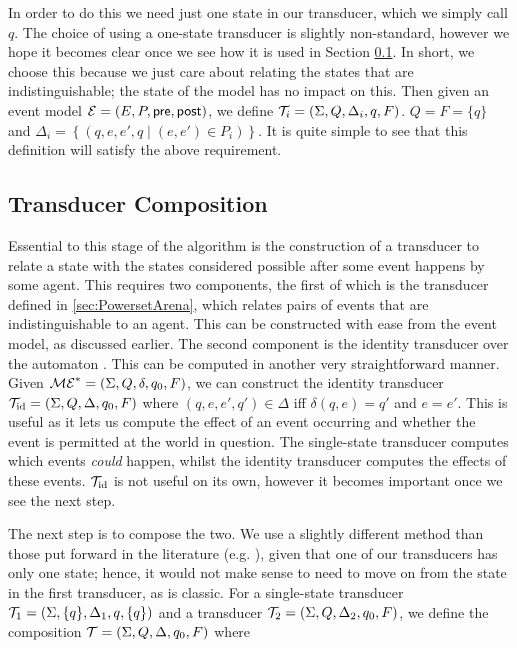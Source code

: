 \documentclass[ %
                    author={Leo Poulson},
                supervisor={Dr. Steven Ramsay},
                    degree={BSc},
                     title={Epistemic Planning for the Dynamic Gossip problem},
                  subtitle={},
                      year={2019} ]{dissertation}
\begin{document}
In order to do this we need just one state in our transducer, which we simply
call $q$. The choice of using a one-state transducer is slightly non-standard,
however we hope it becomes clear once we see how it is used in Section
\ref{sec:TransducerComposition}. In short, we choose this because we just care
about relating the states that are indistinguishable; the state of the model has
no impact on this. Then given an event model $\mathcal{E} = (E, P, \textsf{pre}, \textsf{post})$, we
define $\mathcal{T}_i = (\Sigma, Q, \Delta_i, q, F)$. $Q = F = \{q\}$ and $\Delta_i =
\left\{ (q, e, e', q \mid (e, e') \in P_i) \right\}$. It is quite simple to see
that this definition will satisfy the above requirement.

\subsection{Transducer Composition}
\label{sec:TransducerComposition}

Essential to this stage of the algorithm is the construction of a transducer to
relate a state with the states considered possible after some event happens by
some agent. This requires two components, the first of which is the transducer
defined in \ref{sec:PowersetArena}, which relates pairs of events that are
indistinguishable to an agent. This can be constructed with ease from the event
model, as discussed earlier. The second component is the identity transducer
over the automaton \mestar. This can be computed in another very straightforward
manner. Given $\mathcal{ME}^\ast = (\Sigma, Q, \delta, q_0, F)$, we can construct the
identity transducer $\mathcal{T}_{\text{id}} = (\Sigma, Q, \Delta, q_0, F)$ where
$(q, e, e', q') \in \Delta$ iff $\delta(q, e) = q'$ and $e = e'$. This is useful
as it lets us compute the effect of an event occurring and whether the event is
permitted at the world in question. The single-state transducer computes which
events \emph{could} happen, whilst the identity transducer computes the effects
of these events. $\mathcal{T}_{\text{id}}$ is not useful on its own, however it
becomes important once we see the next step.

The next step is to compose the two. We use a slightly different method than
those put forward in the literature (e.g. \cite{ComposingFSTs}), given that one of
our transducers has only one state; hence, it would not make sense to need to
move on from the state in the first transducer, as is classic. For a
single-state transducer $\mathcal{T}_1 = (\Sigma, \{q\}, \Delta_1, q, \{q\})$ and
a transducer $\mathcal{T}_2 = (\Sigma, Q, \Delta_2, q_0, F)$, we define the
composition $\mathcal{T} = (\Sigma, Q, \Delta, q_0, F)$ where 
\end{document}
